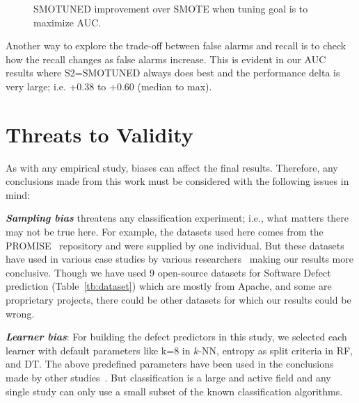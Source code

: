 \documentclass[10pt,conference]{IEEEtran}
\theoremstyle{break}
\theoremstyle{break}
\begin{document}
\begin{figure}[!htbp]
    \caption{SMOTUNED improvement over SMOTE when tuning goal is to maximize AUC.}
    \vspace{-10pt}
    \label{fig:auc}
\vspace{-0.6cm}
\end{figure} 

Another way to explore the trade-off between false alarms and recall is to check how the recall changes as false
alarms increase. This is evident in our AUC results where S2=SMOTUNED always does best 
and the performance delta is very large; i.e. +0.38 to +0.60 (median to max).

 


\section{Threats to Validity}
\label{sect:validity}

As with any empirical study, biases can affect the final
results. Therefore, any conclusions made from this work must be considered with the following issues in mind:

\textbf{\textit{Sampling bias}} threatens any classification experiment; i.e., what matters there may not be true here. For example, the datasets used here comes from the PROMISE~\cite{promiserepo} repository and were supplied by one individual. But these datasets have used in various case studies by various researchers~\cite{he2012investigation,peters2013better,peters2013balancing,turhan2013empirical} making our results more conclusive.
Though we have used 9 open-source datasets for Software Defect prediction (Table~\ref{tb:dataset}) which are mostly from Apache, and some are proprietary projects, there could be other datasets for which our results could be wrong.

\textbf{\textit{Learner bias}}: For building the defect predictors in this
study, we selected each learner with default parameters like k=8 in $k$-NN, entropy as split criteria in RF, and DT. The above predefined parameters have been used in the conclusions made by other studies~\cite{ghotra2015revisiting,tantithamthavorn2016automated}. But classification is a large and active field and any single study can only use a small subset of the known classification algorithms.
\end{document}
